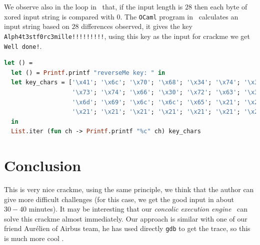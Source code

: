 \documentclass{easychair}
\begin{document}
We observe also in the loop in~ that, if the input length is $28$ then each byte of xored input string is compared with $0$. The \texttt{OCaml} program in~ calculates an input string based on $28$ differences observed, it gives the key \texttt{Alph4t3stf0rc3mille!!!!!!!!!}, using this key as the input for crackme we get \texttt{Well done!}.

\begin{lstlisting}[frame=single, caption={Calculate good input}, captionpos=b, boxpos=b, language=Caml, label=lst:keygen]
let () =
  let () = Printf.printf "reverseMe key: " in
  let key_chars = ['\x41'; '\x6c'; '\x70'; '\x68'; '\x34'; '\x74'; '\x33';
                   '\x73'; '\x74'; '\x66'; '\x30'; '\x72'; '\x63'; '\x33';
                   '\x6d'; '\x69'; '\x6c'; '\x6c'; '\x65'; '\x21'; '\x21';
                   '\x21'; '\x21'; '\x21'; '\x21'; '\x21'; '\x21'; '\x21']
  in
  List.iter (fun ch -> Printf.printf "%c" ch) key_chars
\end{lstlisting}



\section{Conclusion}
This is very nice crackme, using the same principle, we think that the author can give more difficult challenges (for this case, we get the good input in about $30-40$ minutes). It may be interesting that our \emph{concolic execution engine}~\autocite{binsec} can solve this crackme almost immediately. Our approach is similar with one of our friend Aurélien of Airbus team, he has used directly \texttt{gdb} to get the trace, so this is much more cool \smiley{}. 

\printbibliography
\end{document}
